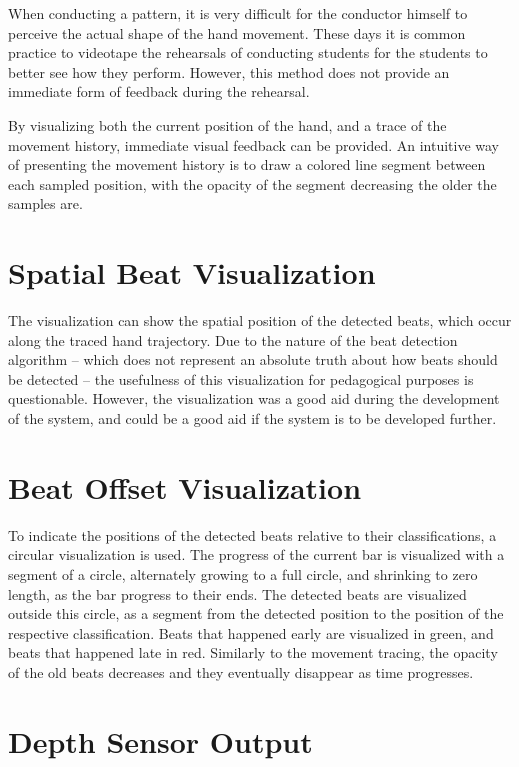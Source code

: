 When conducting a pattern,
it is very difficult for the conductor himself to
perceive the actual shape of the hand movement.
These days it is common practice to 
videotape the rehearsals of conducting students \cite{?}
for the students to better see how they perform.
However, this method does not provide an
immediate form of feedback during the rehearsal.

By visualizing both the current position of the hand,
and a trace of the movement history,
immediate visual feedback can be provided.
An intuitive way of presenting the movement history
is to draw a colored line segment between each sampled position,
with the opacity of the segment decreasing the older the samples are.

\section{Spatial Beat Visualization}

The visualization can show the spatial position
of the detected beats,
which occur along the traced hand trajectory.
Due to the nature of the beat detection algorithm --
which does not represent an absolute truth about
how beats should be detected --
the usefulness of this visualization for
pedagogical purposes is questionable.
However, the visualization was a good aid
during the development of the system,
and could be a good aid if the system is to be developed further.

\section{Beat Offset Visualization}

To indicate the positions of the detected beats
relative to their classifications,
a circular visualization is used.
The progress of the current bar
is visualized with a segment of a circle,
alternately growing to a full circle,
and shrinking to zero length,
as the bar progress to their ends.
The detected beats are visualized outside this circle,
as a segment from the detected position
to the position of the respective classification.
Beats that happened early are visualized in green,
and beats that happened late in red.
Similarly to the movement tracing,
the opacity of the old beats decreases
and they eventually disappear as time progresses.

\section{Depth Sensor Output}

